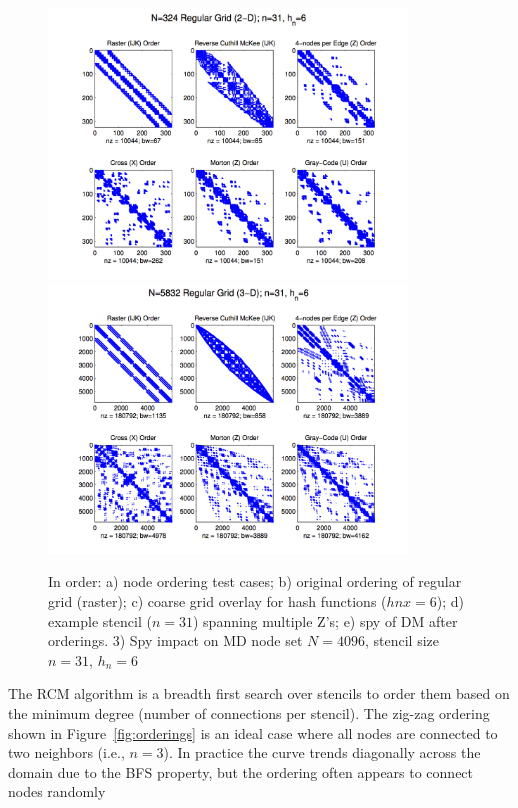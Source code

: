 \documentclass{report}
\begin{document}
\begin{figure}
\centering
\includegraphics[width=0.85\textwidth]{rbffd_methods_content/hashing/spy_regulargrid_N18d2_n31_hn6.png} \\
\includegraphics[width=0.85\textwidth]{rbffd_methods_content/hashing/spy_regulargrid_N18d3_n31_hn6.png} 
\caption{In order: a) node ordering test cases; b) original ordering of regular grid (raster); c) coarse grid overlay for hash functions ($hnx = 6$); d) example stencil ($n=31$) spanning multiple Z's; e) spy of DM after orderings.  3) Spy impact on MD node set $N=4096$, stencil size $n=31$, $h_n = 6$ }
\label{fig:ordering_impact_rg}
\end{figure}


The RCM algorithm is a breadth first search over stencils to order them based on the minimum degree (number of connections per stencil). The zig-zag ordering shown in Figure~\ref{fig:orderings} is an ideal case where all nodes are connected to two neighbors (i.e., $n=3$). In practice the curve trends diagonally across the domain due to the BFS property, but the ordering often appears to connect nodes randomly 
\end{document}

